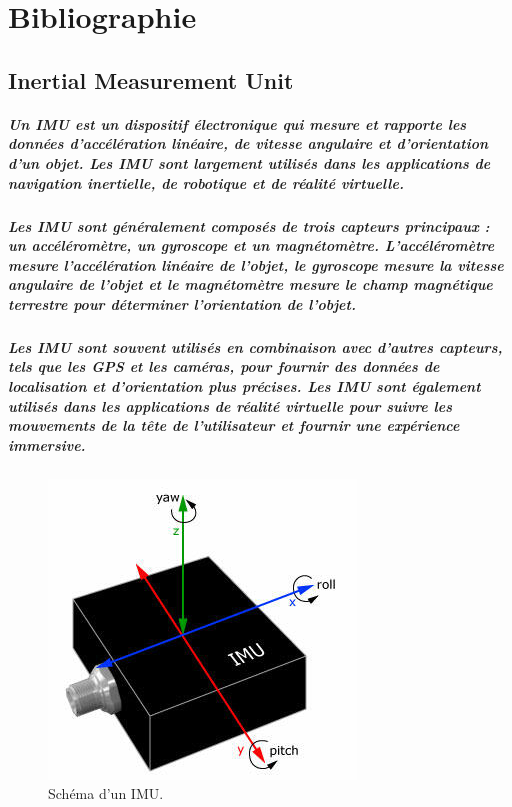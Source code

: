 \chapter{Bibliographie}
\label{cp:bibliographie}

\section{Inertial Measurement Unit}

\paragraph{Un IMU est un dispositif électronique qui mesure et rapporte les données d'accélération linéaire, de vitesse angulaire et d'orientation d'un objet. Les IMU sont largement utilisés dans les applications de navigation inertielle, de robotique et de réalité virtuelle.}

\paragraph{Les IMU sont généralement composés de trois capteurs principaux : un accéléromètre, un gyroscope et un magnétomètre. L'accéléromètre mesure l'accélération linéaire de l'objet, le gyroscope mesure la vitesse angulaire de l'objet et le magnétomètre mesure le champ magnétique terrestre pour déterminer l'orientation de l'objet.}

\paragraph{Les IMU sont souvent utilisés en combinaison avec d'autres capteurs, tels que les GPS et les caméras, pour fournir des données de localisation et d'orientation plus précises. Les IMU sont également utilisés dans les applications de réalité virtuelle pour suivre les mouvements de la tête de l'utilisateur et fournir une expérience immersive.}

\begin{figure}[!htpb]
    \centering
    \includegraphics[width=0.5\linewidth]{Figures/imu.jpg}
    \caption[Schéma d'un IMU]{Schéma d'un IMU.}
    \label{fig:imu}
\end{figure}


